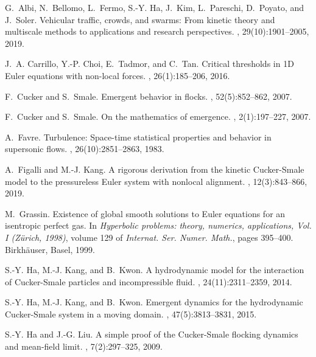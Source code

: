 \documentclass[11pt,letterpaper]{amsart}
\theoremstyle{plain}
\theoremstyle{definition}
\theoremstyle{remark}
\begin{document}
\begin{thebibliography}{10}

G.~Albi, N.~Bellomo, L.~Fermo, S.-Y. Ha, J.~Kim, L.~Pareschi, D.~Poyato, and
  J.~Soler.
\newblock Vehicular traffic, crowds, and swarms: {F}rom kinetic theory and
  multiscale methods to applications and research perspectives.
, 29(10):1901--2005, 2019.

J.~A. Carrillo, Y.-P. Choi, E.~Tadmor, and C.~Tan.
\newblock Critical thresholds in 1{D} {E}uler equations with non-local forces.
, 26(1):185--206, 2016.

F.~Cucker and S.~Smale.
\newblock Emergent behavior in flocks.
, 52(5):852--862, 2007.

F.~Cucker and S.~Smale.
\newblock On the mathematics of emergence.
, 2(1):197--227, 2007.

A.~Favre.
\newblock Turbulence: Space-time statistical properties and behavior in
  supersonic flows.
, 26(10):2851--2863, 1983.

A.~Figalli and M.-J. Kang.
\newblock A rigorous derivation from the kinetic {C}ucker-{S}male model to the
  pressureless {E}uler system with nonlocal alignment.
, 12(3):843--866, 2019.

M.~Grassin.
\newblock Existence of global smooth solutions to {E}uler equations for an
  isentropic perfect gas.
\newblock In {\em Hyperbolic problems: theory, numerics, applications, {V}ol.
  {I} ({Z}\"{u}rich, 1998)}, volume 129 of {\em Internat. Ser. Numer. Math.},
  pages 395--400. Birkh\"{a}user, Basel, 1999.

S.-Y. Ha, M.-J. Kang, and B.~Kwon.
\newblock A hydrodynamic model for the interaction of {C}ucker-{S}male
  particles and incompressible fluid.
, 24(11):2311--2359, 2014.

S.-Y. Ha, M.-J. Kang, and B.~Kwon.
\newblock Emergent dynamics for the hydrodynamic {C}ucker-{S}male system in a
  moving domain.
, 47(5):3813--3831, 2015.

S.-Y. Ha and J.-G. Liu.
\newblock A simple proof of the {C}ucker-{S}male flocking dynamics and
  mean-field limit.
, 7(2):297--325, 2009.


\end{thebibliography}
\end{document}
